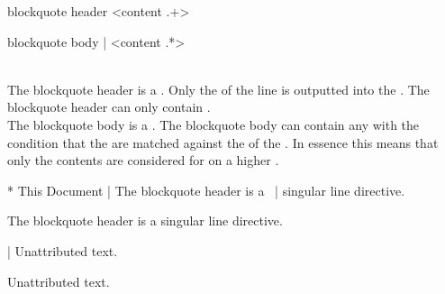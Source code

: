 \begin{identifier}{blockquote header}
\* <content .+>
\end{identifier}
\begin{identifier}{blockquote body}
| <content .*>
\end{identifier}
 \\

The blockquote header is a . Only the  of the line is outputted into the . The blockquote header can only contain . \\

The blockquote body is a . The blockquote body can contain any  with the condition that the  are matched against the  of the . In essence this means that only the  contents are considered for  on a higher . \\

\begin{examples}
  \begin{examplesource}
* This Document
| The blockquote header is a \
| singular line directive.
  \end{examplesource}
  \begin{exampleoutput}
    \begin{blockquote}
      The blockquote header is a singular line directive.
    \end{blockquote}
  \end{exampleoutput}
  \begin{examplesource}
| Unattributed text.
  \end{examplesource}
  \begin{exampleoutput}
    \begin{blockquote}
      Unattributed text.
    \end{blockquote}
  \end{exampleoutput}
\end{examples}

